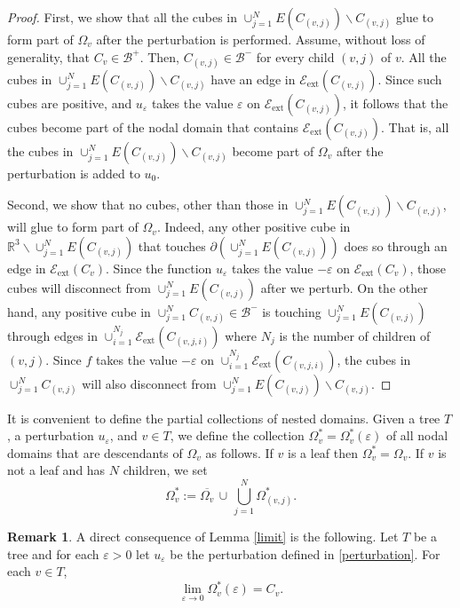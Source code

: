 \documentclass[11pt,reqno]{amsart}
\newcommand{\R}{{\mathbb R}}
\newcommand{\ep}{\varepsilon}
\theoremstyle{definition}
\newtheorem{remark}{Remark}
\begin{document}
\begin{proof}
First, we show that all the cubes in $\cup_{j=1}^N E(C_{(v,j)} ) \backslash C_{(v,j)}$ glue to form part of $\Omega_v$ after the perturbation is performed.  Assume, without loss of generality, that $C_v \in \mathcal B^+$. Then,  $C_{(v,j)} \in \mathcal B^-$ for every child $(v,j)$ of $v$.
All the cubes in $\cup_{j=1}^N E(C_{(v,j)} ) \backslash C_{(v,j)}$ have an edge in   $\mathcal E_{\text{ext}} (C_{(v,j)})$. Since such cubes are positive, and $u_\ep$ takes the value $\ep$ on $\mathcal E_{\text{ext}} (C_{(v,j)})$, it follows that  the cubes become part of the nodal domain that contains $\mathcal E_{\text{ext}} (C_{(v,j)})$. That is, all the cubes in $\cup_{j=1}^N E(C_{(v,j)} ) \backslash C_{(v,j)}$  become part of $\Omega_v$ after the perturbation is added to $u_0$.

Second, we show that no cubes, other than those in $ \cup_{j=1}^N E(C_{(v,j)} ) \backslash C_{(v,j)}$, will glue to  form part of $\Omega_v$. Indeed, any other positive cube in  $\R^3 \backslash \cup_{j=1}^N E(C_{(v,j)} ) $ that touches $\partial  ( \cup_{j=1}^N E(C_{(v,j)} ) )$ does so through an edge in $\mathcal E_{\text{ext}} (C_{v})$. Since the function $u_\ep$ takes the value $-\ep$ on $\mathcal E_{\text{ext}} (C_{v})$, those cubes will disconnect from $\cup_{j=1}^N E(C_{(v,j)} ) $ after we perturb. On the other hand, any positive cube in $ \cup_{j=1}^N C_{(v,j)} \in \mathcal B^-$ is touching $ \cup_{j=1}^N E(C_{(v,j)} )$ through edges in $ \cup_{i=1}^{N_j} \mathcal E_{\text{ext}} (C_{(v,j,i)})$ where $N_j$ is the number of children of $(v,j)$. Since $f$ takes the value $-\ep$ on $ \cup_{i=1}^{N_j} \mathcal E_{\text{ext}} (C_{(v,j,i)})$, the cubes in $ \cup_{j=1}^N C_{(v,j)} $ will also disconnect from $ \cup_{j=1}^N E(C_{(v,j)} ) \backslash C_{(v,j)}$.
\end{proof}


It is convenient to define the partial collections of nested domains. Given a tree $T$ , a perturbation  $u_\ep$, and $v \in T$, we define the collection $\Omega_v^*=\Omega_v^*(\ep)$ of all nodal domains that are descendants of $\Omega_v$ as follows. If $v$ is a leaf then $\Omega_v^*=\Omega_v$. If $v$ is not a leaf and has $N$ children, we set
 \[\Omega_v^*:= \overline{\Omega_v}\, \cup\, \bigcup_{j=1}^N \Omega_{(v,j)}^*. \]
 

\begin{remark} A direct consequence of Lemma \ref{limit} is the following.
Let $T$ be a tree and for each  $\ep>0$ let $u_\ep$ be the perturbation defined in \eqref{perturbation}.  For each  $v \in T$, 
\[\lim_{\ep \to 0} \Omega_v^*(\ep)= C_v.\]
\end{remark}
\end{document}
